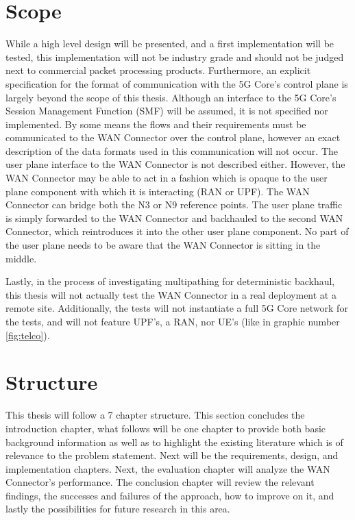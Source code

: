 \section{Scope}
\label{sec:scope}

While a high level design will be presented, and a first implementation will be tested, this implementation will not be industry grade and should not be judged next to commercial packet processing products.  Furthermore, an explicit specification for the format of communication with the 5G Core's control plane is largely beyond the scope of this thesis. Although an interface to the 5G Core's Session Management Function (SMF) will be assumed, it is not specified nor implemented. By some means the flows and their requirements must be communicated to the WAN Connector over the control plane, however an exact description of the data formats used in this communication will not occur. The user plane interface to the WAN Connector is not described either. However, the WAN Connector may be able to act in a fashion which is opaque to the user plane component with which it is interacting (RAN or UPF). The WAN Connector can bridge both the N3 or N9 reference points. The user plane traffic is simply forwarded to the WAN Connector and backhauled to the second WAN Connector, which reintroduces it into the other user plane component. No part of the user plane needs to be aware that the WAN Connector is sitting in the middle.

Lastly, in the process of investigating multipathing for deterministic backhaul, this thesis will not actually test the WAN Connector in a real deployment at a remote site. Additionally, the tests will not instantiate a full 5G Core network for the tests, and will not feature UPF's, a RAN, nor UE's (like in graphic number \ref{fig:telco}).

\section{Structure}

This thesis will follow a 7 chapter structure. This section concludes the introduction chapter, what follows will be one chapter to provide both basic background information as well as to highlight the existing literature which is of relevance to the problem statement. Next will be the requirements, design, and implementation chapters. Next, the evaluation chapter will analyze the WAN Connector's performance. The conclusion chapter will review the relevant findings, the successes and failures of the approach, how to improve on it, and lastly the possibilities for future research in this area.



\nocite{tsai2006review}
\nocite{rodriguez2004mar}
\nocite{tarique2009survey}
\nocite{tao2004application}
\nocite{zand2012wireless}
\nocite{li2016multipath}
